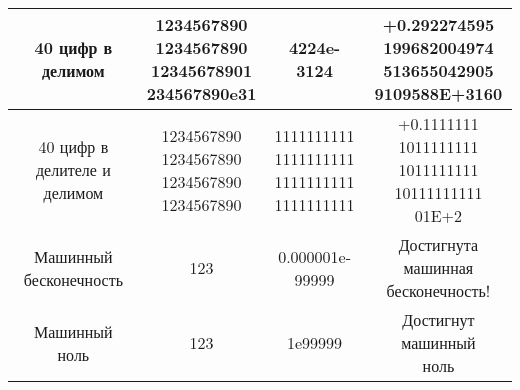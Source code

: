 \begin{table}[ht]
{\begin{tabular}{|c|c|c|c|}
			\hline
			40 цифр в делимом & \makecell{1234567890\\1234567890\\12345678901\\234567890e31} & 4224e-3124 & \makecell{+0.292274595\\199682004974\\513655042905\\9109588E+3160} \\
			\hline
			40 цифр в делителе и делимом & \makecell{1234567890\\1234567890\\1234567890\\1234567890} & \makecell{1111111111\\1111111111\\1111111111\\1111111111} & \makecell{+0.1111111\\1011111111\\1011111111\\10111111111\\01E+2} \\
			\hline
			Машинный бесконечность & 123 & 0.000001e-99999 &\makecell{Достигнута машинная\\бесконечность!}\\
			\hline
			Машинный ноль & 123 & 1e99999 & \makecell{Достигнут машинный\\ноль }\\
			\hline
		\end{tabular}
	} %
\end{table}

